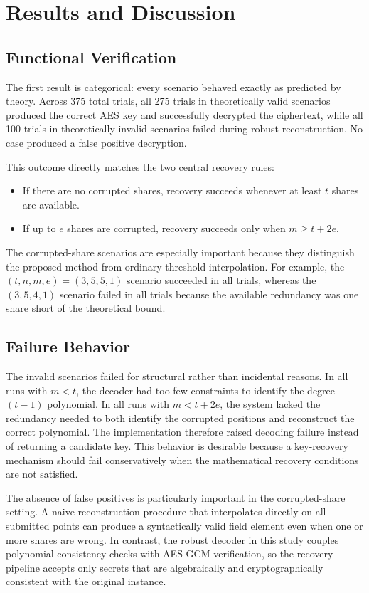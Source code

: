 \section{Results and Discussion}

\subsection{Functional Verification}

The first result is categorical: every scenario behaved exactly as predicted by theory. Across 375 total trials, all 275 trials in theoretically valid scenarios produced the correct AES key and successfully decrypted the ciphertext, while all 100 trials in theoretically invalid scenarios failed during robust reconstruction. No case produced a false positive decryption.

This outcome directly matches the two central recovery rules:
\begin{itemize}
\item If there are no corrupted shares, recovery succeeds whenever at least $t$ shares are available.
\item If up to $e$ shares are corrupted, recovery succeeds only when $m \geq t + 2e$.
\end{itemize}

The corrupted-share scenarios are especially important because they distinguish the proposed method from ordinary threshold interpolation. For example, the $(t,n,m,e)=(3,5,5,1)$ scenario succeeded in all trials, whereas the $(3,5,4,1)$ scenario failed in all trials because the available redundancy was one share short of the theoretical bound.

\subsection{Failure Behavior}

The invalid scenarios failed for structural rather than incidental reasons. In all runs with $m<t$, the decoder had too few constraints to identify the degree-$(t-1)$ polynomial. In all runs with $m<t+2e$, the system lacked the redundancy needed to both identify the corrupted positions and reconstruct the correct polynomial. The implementation therefore raised decoding failure instead of returning a candidate key. This behavior is desirable because a key-recovery mechanism should fail conservatively when the mathematical recovery conditions are not satisfied.

The absence of false positives is particularly important in the corrupted-share setting. A naive reconstruction procedure that interpolates directly on all submitted points can produce a syntactically valid field element even when one or more shares are wrong. In contrast, the robust decoder in this study couples polynomial consistency checks with AES-GCM verification, so the recovery pipeline accepts only secrets that are algebraically and cryptographically consistent with the original instance.

